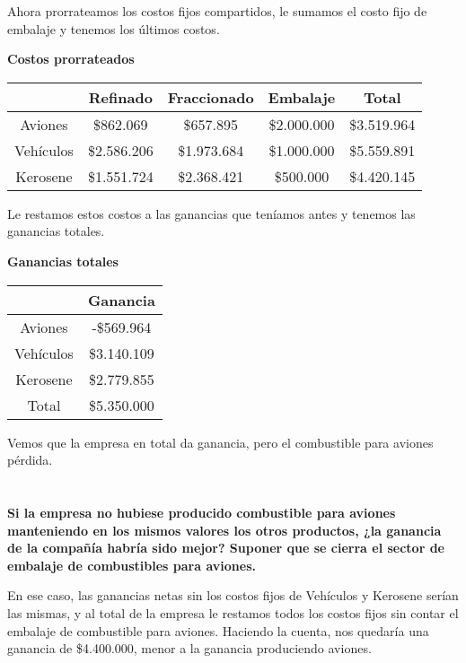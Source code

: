 \documentclass[10pt,a4paper]{article}
\begin{document}
Ahora prorrateamos los costos fijos compartidos, le sumamos el costo fijo de embalaje y tenemos los últimos costos.

\begin{center}
	\textbf{Costos prorrateados}

	\begin{tabular}{| c || c | c | c || c |}
		\hline
		&           Refinado    & Fraccionado & Embalaje    & Total \\
		\hline
		Aviones   & \$862.069   & \$657.895   & \$2.000.000 & \$3.519.964  \\
		\hline
		Vehículos & \$2.586.206 & \$1.973.684 & \$1.000.000 & \$5.559.891  \\
		\hline
		Kerosene  & \$1.551.724 & \$2.368.421 & \$500.000   & \$4.420.145 \\
		\hline
	\end{tabular}
\end{center}

Le restamos estos costos a las ganancias que teníamos antes y tenemos las ganancias totales.

\begin{center}
	\textbf{Ganancias totales}

	\begin{tabular}{| c | c |}
		\hline
		&           Ganancia    \\
		\hline
		Aviones   & -\$569.964  \\
		\hline
		Vehículos & \$3.140.109 \\
		\hline
		Kerosene  & \$2.779.855 \\
		\hline
		Total     & \$5.350.000\\
		\hline
	\end{tabular}
\end{center}

Vemos que la empresa en total da ganancia, pero el combustible para aviones pérdida.

\section{}
\textbf{Si la empresa no hubiese producido combustible para aviones manteniendo en los mismos valores los otros productos, ¿la ganancia de la compañía habría sido mejor? Suponer que se cierra el sector de embalaje de combustibles para aviones.}

En ese caso, las ganancias netas sin los costos fijos de Vehículos y Kerosene serían las mismas, y al total de la empresa le restamos todos los costos fijos sin contar el embalaje de combustible para aviones. Haciendo la cuenta, nos quedaría una ganancia de \$4.400.000, menor a la ganancia produciendo aviones.
\end{document}
